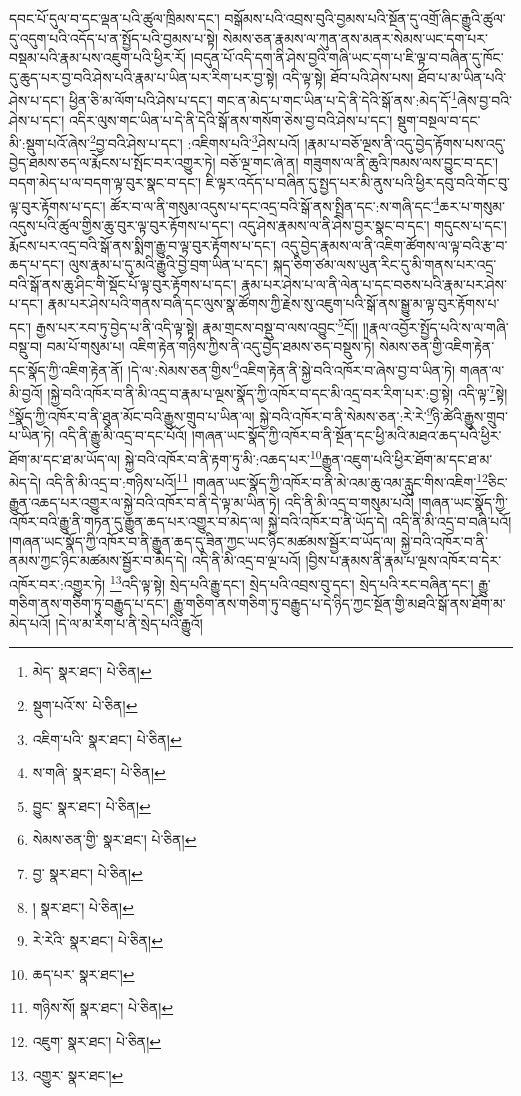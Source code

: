 དབང་པོ་དུལ་བ་དང་ལྡན་པའི་ཚུལ་ཁྲིམས་དང་། བསྒོམས་པའི་འབྲས་བུའི་བྱམས་པའི་སྔོན་དུ་འགྲོ་ཞིང་རྒྱུའི་ཚུལ་དུ་འདུག་པའི་འདོད་པ་ན་སྤྱོད་པའི་བྱམས་པ་སྟེ། སེམས་ཅན་རྣམས་ལ་ཀུན་ནས་མནར་སེམས་ཡང་དག་པར་བསྡམ་པའི་རྣམ་པས་འཇུག་པའི་ཕྱིར་རོ། །བདུན་པོ་འདི་དག་ནི་ཤེས་བྱའི་གཞི་ཡང་དག་པ་ཇི་ལྟ་བ་བཞིན་དུ་ཁོང་དུ་ཆུད་པར་བྱ་བའི་ཤེས་པའི་རྣམ་པ་ཡིན་པར་རིག་པར་བྱ་སྟེ། འདི་ལྟ་སྟེ། ཐོབ་པའི་ཤེས་པས། ཐོབ་པ་མ་ཡིན་པའི་ཤེས་པ་དང་། ཕྱིན་ཅི་མ་ལོག་པའི་ཤེས་པ་དང་། གང་ན་མེད་པ་གང་ཡིན་པ་དེ་ནི་དེའི་སྒོ་ནས་:མེད་དོ་\footnote{མེད་  སྣར་ཐང་།  པེ་ཅིན། }ཞེས་བྱ་བའི་ཤེས་པ་དང་། འདིར་ལུས་གང་ཡིན་པ་དེ་ནི་དེའི་སྒོ་ནས་གསོག་ཅེས་བྱ་བའི་ཤེས་པ་དང་། སྡུག་བསྔལ་བ་དང་མི་:སྡུག་པའོ་ཞེས་\footnote{སྡུག་པའོ་ས་  པེ་ཅིན། }བྱ་བའི་ཤེས་པ་དང་། :འཇིགས་པའི་\footnote{འཇིག་པའི་  སྣར་ཐང་།  པེ་ཅིན། }ཤེས་པའོ། །རྣམ་པ་བཅོ་ལྔས་ནི་འདུ་བྱེད་རྟོགས་པས་འདུ་བྱེད་ཐམས་ཅད་ལ་རྨོངས་པ་སྤོང་བར་འགྱུར་ཏེ། བཅོ་ལྔ་གང་ཞེ་ན། གཟུགས་ལ་ནི་ཆུའི་ཁམས་ལས་བྱུང་བ་དང་། བདག་མེད་པ་ལ་བདག་ལྟ་བུར་སྣང་བ་དང་། ཇི་ལྟར་འདོད་པ་བཞིན་དུ་སྤྱད་པར་མི་ནུས་པའི་ཕྱིར་དབུ་བའི་གོང་བུ་ལྟ་བུར་རྟོགས་པ་དང་། ཚོར་བ་ལ་ནི་གསུམ་འདུས་པ་དང་འདྲ་བའི་སྒོ་ནས་སྤྲིན་དང་:ས་གཞི་དང་\footnote{ས་གཞི་  སྣར་ཐང་།  པེ་ཅིན། }ཆར་པ་གསུམ་འདུས་པའི་ཚུལ་གྱིས་ཆུ་བུར་ལྟ་བུར་རྟོགས་པ་དང་། འདུ་ཤེས་རྣམས་ལ་ནི་ཤེས་བྱར་སྣང་བ་དང་། གདུངས་པ་དང་། རྨོངས་པར་འདྲ་བའི་སྒོ་ནས་སྨིག་རྒྱུ་བ་ལྟ་བུར་རྟོགས་པ་དང་། འདུ་བྱེད་རྣམས་ལ་ནི་འཇིག་ཚོགས་ལ་ལྟ་བའི་རྩ་བ་ཆད་པ་དང་། ལུས་རྣམ་པ་དུ་མའི་རྒྱུའི་བྱེ་བྲག་ཡིན་པ་དང་། སྐད་ཅིག་ཙམ་ལས་ཡུན་རིང་དུ་མི་གནས་པར་འདྲ་བའི་སྒོ་ནས་ཆུ་ཤིང་གི་སྡོང་པོ་ལྟ་བུར་རྟོགས་པ་དང་། རྣམ་པར་ཤེས་པ་ལ་ནི་ལེན་པ་དང་བཅས་པའི་རྣམ་པར་ཤེས་པ་དང་། རྣམ་པར་ཤེས་པའི་གནས་བཞི་དང་ལུས་སྣ་ཚོགས་ཀྱི་རྗེས་སུ་འཇུག་པའི་སྒོ་ནས་སྒྱུ་མ་ལྟ་བུར་རྟོགས་པ་དང་། རྒྱས་པར་རབ་ཏུ་བྱེད་པ་ནི་འདི་ལྟ་སྟེ། རྣམ་གྲངས་བསྡུ་བ་ལས་འབྱུང་\footnote{བྱུང་  སྣར་ཐང་།  པེ་ཅིན། }ངོ།། །།རྣལ་འབྱོར་སྤྱོད་པའི་ས་ལ་གཞི་བསྡུ་བ། བམ་པོ་གསུམ་པ། འཇིག་རྟེན་གཉིས་ཀྱིས་ནི་འདུ་བྱེད་ཐམས་ཅད་བསྡུས་ཏེ། སེམས་ཅན་གྱི་འཇིག་རྟེན་དང་སྣོད་ཀྱི་འཇིག་རྟེན་ནོ། །དེ་ལ་:སེམས་ཅན་གྱིས་\footnote{སེམས་ཅན་གྱི་  སྣར་ཐང་།  པེ་ཅིན། }འཇིག་རྟེན་ནི་སྐྱེ་བའི་འཁོར་བ་ཞེས་བྱ་བ་ཡིན་ཏེ། གཞན་ལ་མི་བྱའོ། །སྐྱེ་བའི་འཁོར་བ་ནི་མི་འདྲ་བ་རྣམ་པ་ལྔས་སྣོད་ཀྱི་འཁོར་བ་དང་མི་འདྲ་བར་རིག་པར་:བྱ་སྟེ། འདི་ལྟ་\footnote{བྱ་  སྣར་ཐང་།  པེ་ཅིན། }སྟེ། \footnote{།    སྣར་ཐང་།  པེ་ཅིན། }སྣོད་ཀྱི་འཁོར་བ་ནི་ཐུན་མོང་བའི་རྒྱུས་གྲུབ་པ་ཡིན་ལ། སྐྱེ་བའི་འཁོར་བ་ནི་སེམས་ཅན་:རེ་རེ་\footnote{རེ་རེའི་  སྣར་ཐང་།  པེ་ཅིན། }ཉི་ཚེའི་རྒྱུས་གྲུབ་པ་ཡིན་ཏེ། འདི་ནི་རྒྱུ་མི་འདྲ་བ་དང་པོའོ། །གཞན་ཡང་སྣོད་ཀྱི་འཁོར་བ་ནི་སྔོན་དང་ཕྱི་མའི་མཐའ་ཆད་པའི་ཕྱིར་ཐོག་མ་དང་ཐ་མ་ཡོད་ལ། སྐྱེ་བའི་འཁོར་བ་ནི་རྟག་ཏུ་མི་:འཆད་པར་\footnote{ཆད་པར་  སྣར་ཐང་། }རྒྱུན་འཇུག་པའི་ཕྱིར་ཐོག་མ་དང་ཐ་མ་མེད་དེ། འདི་ནི་མི་འདྲ་བ་:གཉིས་པའོ།\footnote{གཉིས་སོ།  སྣར་ཐང་།  པེ་ཅིན། } །གཞན་ཡང་སྣོད་ཀྱི་འཁོར་བ་ནི་མེ་འམ་ཆུ་འམ་རླུང་གིས་འཇིག་\footnote{འཇུག་  སྣར་ཐང་།  པེ་ཅིན། }ཅིང་རྒྱུན་འཆད་པར་འགྱུར་ལ་སྐྱེ་བའི་འཁོར་བ་ནི་དེ་ལྟ་མ་ཡིན་ཏེ། འདི་ནི་མི་འདྲ་བ་གསུམ་པའོ། །གཞན་ཡང་སྣོད་ཀྱི་འཁོར་བའི་རྒྱུ་ནི་གཏན་དུ་རྒྱུན་ཆད་པར་འགྱུར་བ་མེད་ལ། སྐྱེ་བའི་འཁོར་བ་ནི་ཡོད་དེ། འདི་ནི་མི་འདྲ་བ་བཞི་པའོ། །གཞན་ཡང་སྣོད་ཀྱི་འཁོར་བ་ནི་རྒྱུན་ཆད་དུ་ཟིན་ཀྱང་ཡང་ཉིང་མཚམས་སྦྱོར་བ་ཡོད་ལ། སྐྱེ་བའི་འཁོར་བ་ནི་ནམས་ཀྱང་ཉིང་མཚམས་སྦྱོར་བ་མེད་དེ། འདི་ནི་མི་འདྲ་བ་ལྔ་པའོ། །བྱིས་པ་རྣམས་ནི་རྣམ་པ་ལྔས་འཁོར་བ་དེར་འཁོར་བར་:འགྱུར་ཏེ། \footnote{འགྱུར་  སྣར་ཐང་། }འདི་ལྟ་སྟེ། སྲེད་པའི་རྒྱུ་དང་། སྲེད་པའི་འབྲས་བུ་དང་། སྲེད་པའི་རང་བཞིན་དང་། རྒྱུ་གཅིག་ནས་གཅིག་ཏུ་བརྒྱུད་པ་དང་། རྒྱུ་གཅིག་ནས་གཅིག་ཏུ་བརྒྱུད་པ་དེ་ཉིད་ཀྱང་སྔོན་གྱི་མཐའི་སྒོ་ནས་ཐོག་མ་མེད་པའོ། །དེ་ལ་མ་རིག་པ་ནི་སྲེད་པའི་རྒྱུའོ། 